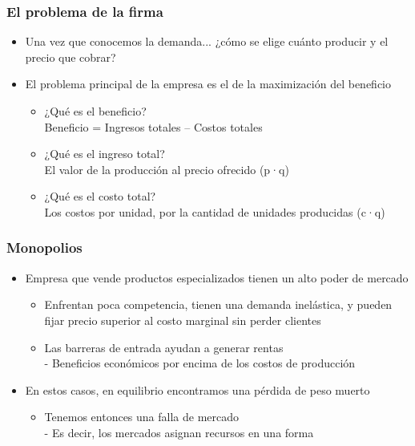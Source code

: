 \documentclass{beamer}
\begin{document}
\begin{frame}
\frametitle{El problema de la firma}
\begin{itemize}
    \item Una vez que conocemos la demanda... ¿cómo se elige cuánto producir y el precio que cobrar?
    \vspace{2mm}
    \item El problema principal de la empresa es el de la maximización del beneficio
    \vspace{2mm}     \begin{itemize}
        \item ¿Qué es el beneficio? \vspace{2mm} \\ 
        Beneficio = Ingresos totales – Costos totales
        \vspace{2mm}
        \item ¿Qué es el ingreso total? 
        \vspace{2mm} \\ 
        El valor de la producción al precio ofrecido (p·q)
        \vspace{2mm}
        \item ¿Qué es el costo total?
        \vspace{2mm} \\ 
        Los costos por unidad, por la cantidad de unidades producidas (c·q)
    \end{itemize} 
\end{itemize} 
\end{frame}

\begin{frame}
\frametitle{Monopolios}
\begin{itemize}
    \item Empresa que vende productos especializados tienen un alto poder de mercado
    \begin{itemize}
        \item Enfrentan poca competencia, tienen una demanda inelástica, y pueden fijar precio superior al costo marginal sin perder clientes
        \item Las barreras de entrada ayudan a generar rentas \\
        - Beneficios económicos por encima de los costos de producción
    \end{itemize}
    \item En estos casos, en equilibrio encontramos una pérdida de peso muerto
    \begin{itemize}
        \item Tenemos entonces una falla de mercado \\
        - Es decir, los mercados asignan recursos en una forma
    \end{itemize}
    \end{itemize}
\end{frame}
\end{document}
